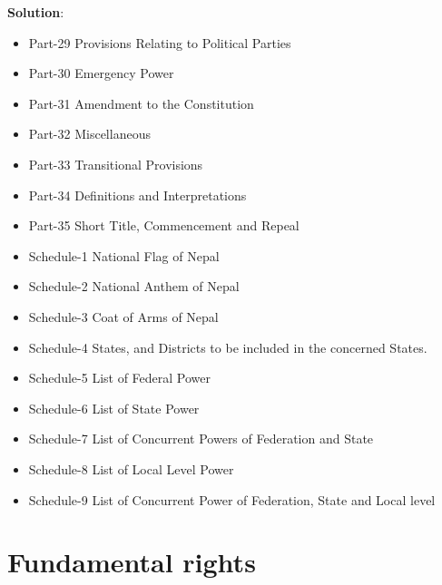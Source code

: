 \documentclass[
  openany]{book}
\newenvironment{solution}{ {\bfseries Solution}:}{}
\begin{document}
\begin{questions}
\begin{solution}
\begin{itemize}
  \item Part-29 Provisions Relating to Political Parties
  \item Part-30 Emergency Power
  \item Part-31 Amendment to the Constitution
  \item Part-32 Miscellaneous
  \item Part-33 Transitional Provisions
  \item Part-34 Definitions and Interpretations
  \item Part-35 Short Title, Commencement and Repeal
  \item Schedule-1 National Flag of Nepal
  \item Schedule-2 National Anthem of Nepal
  \item Schedule-3 Coat of Arms of Nepal
  \item Schedule-4 States, and Districts to be included in the concerned States.
  \item Schedule-5 List of Federal Power
  \item Schedule-6 List of State Power
  \item Schedule-7 List of Concurrent Powers of Federation and State
  \item Schedule-8 List of Local Level Power
  \item Schedule-9 List of Concurrent Power of Federation, State and Local level
  \end{itemize}
  \end{solution}
\end{questions}

\hypertarget{fundamental-rights}{%
\section{Fundamental rights}\label{fundamental-rights}}
\end{document}
